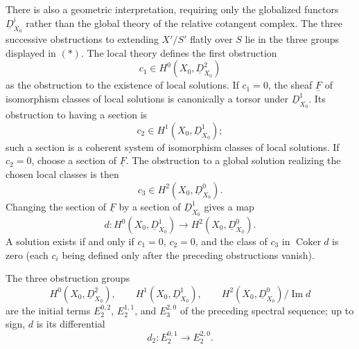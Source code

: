 There is also a geometric interpretation, requiring only the
globalized functors $\underline D^i_{X_0}$ rather than the global
theory of the relative cotangent complex. The three successive
obstructions to extending $X'/S'$ flatly over $S$ lie in the three
groups displayed in $(*)$. The local theory defines the first
obstruction
\[
c_1\in H^0(X_0,\underline D^2_{X_0})
\]
as the obstruction to the existence of local solutions. If $c_1=0$,
the sheaf $\underline F$ of isomorphism classes of local solutions is
canonically a torsor under $\underline D^1_{X_0}$. Its obstruction to
having a section is
\[
c_2\in H^1(X_0,\underline D^1_{X_0});
\]
such a section is a coherent system of isomorphism classes of local
solutions. If $c_2=0$, choose a section of $\underline F$. The
obstruction to a global solution realizing the chosen local classes
is then
\[
c_3\in H^2(X_0,\underline D^0_{X_0}).
\]
Changing the section of $\underline F$ by a section of
$\underline D^1_{X_0}$ gives a map
\[
d:H^0(X_0,\underline D^1_{X_0})
\longrightarrow H^2(X_0,\underline D^0_{X_0}).
\]
A solution exists if and only if $c_1=0$, $c_2=0$, and the class of
$c_3$ in $\operatorname{Coker}d$ is zero (each $c_i$ being defined
only after the preceding obstructions vanish).


The three obstruction groups
\[
H^0(X_0,\underline D^2_{X_0}),
\qquad
H^1(X_0,\underline D^1_{X_0}),
\qquad
H^2(X_0,\underline D^0_{X_0})/\operatorname{Im}d
\]
are the initial terms $E_2^{0,2}$, $E_2^{1,1}$, and $E_3^{2,0}$ of
the preceding spectral sequence; up to sign, $d$ is its differential
\[
d_2:E_2^{0,1}\longrightarrow E_2^{2,0}.
\]

